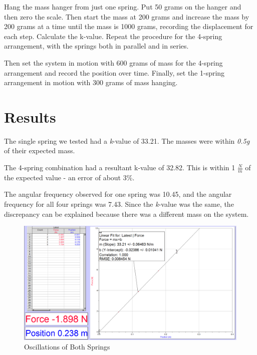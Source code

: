 \documentclass[]{article}
\begin{document}
Hang the mass hanger from just one spring. Put 50 grams on the hanger and then zero the scale. Then start the mass at 200 grams and increase the mass by 200 grams at a time until the mass is 1000 grams, recording the displacement for each step. Calculate the k-value. 
Repeat the procedure for the 4-spring arrangement, with the springs both in parallel and in series.

Then set the system in motion with 600 grams of mass for the 4-spring arrangement and record the position over time. Finally, set the 1-spring arrangement in motion with 300 grams of mass hanging.


\section{Results}

The single spring we tested had a \textit{k}-value of 33.21. The masses were within \textit{0.5g} of their expected mass.

The 4-spring combination had a resultant k-value of 32.82. This is within 1 \textit{$\frac{N}{m}$} of the expected value - an error of about 3\%.

The angular frequency observed for one spring was 10.45, and the angular frequency for all four springs was 7.43. Since the \textit{k}-value was the same, the discrepancy can be explained because there was a different mass on the system.

\begin{figure}[H]
	\centering
	\includegraphics[width=\textwidth]{res/1_1_spring}
	\caption{Oscillations of Both Springs}
	\label{fig:Oscillations of Both Springs}
\end{figure}
\end{document}
